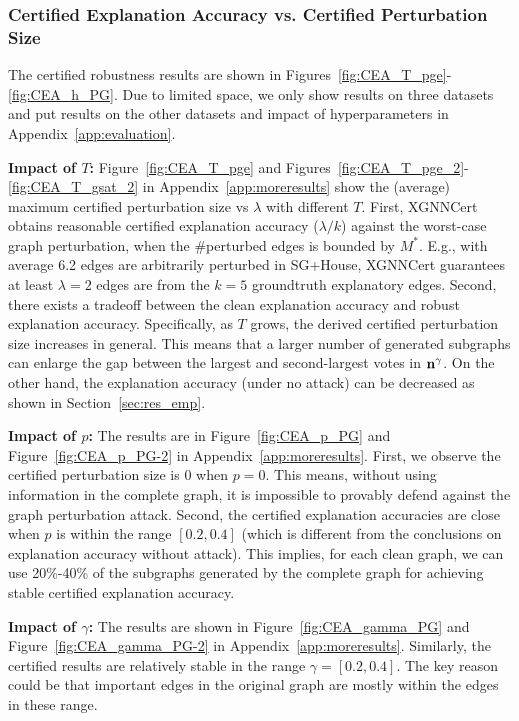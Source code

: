\subsubsection{Certified Explanation Accuracy vs. Certified Perturbation Size}
The certified robustness results are shown in Figures~\ref{fig:CEA_T_pge}-\ref{fig:CEA_h_PG}. Due to limited space, we only show results on three datasets and put results on the other datasets and impact of hyperparameters in Appendix~\ref{app:evaluation}. 

{\bf Impact of $T$:} 
Figure~\ref{fig:CEA_T_pge} and Figures~\ref{fig:CEA_T_pge_2}-\ref{fig:CEA_T_gsat_2} in Appendix~\ref{app:moreresults} show the (average) maximum certified perturbation size vs $\lambda$ with different $T$. 
First, XGNNCert obtains reasonable certified explanation accuracy ($\lambda / k$) against the worst-case graph perturbation, when the \#perturbed edges is bounded by ${M^*}$. 
E.g., with average 6.2 edges are arbitrarily perturbed in SG+House, XGNNCert guarantees at least $\lambda=2$ edges are from the $k=5$ groundtruth explanatory edges. 
Second, there exists a tradeoff between the clean explanation accuracy and robust explanation accuracy. Specifically, as $T$ grows, the derived 
 certified perturbation size increases in general. This means that a larger number of generated subgraphs can enlarge the gap between the largest and  second-largest votes in ${\bf n}^{\gamma}$. On the other hand, the explanation accuracy (under no attack) can be decreased as shown in Section~\ref{sec:res_emp}. 


{\bf Impact of $p$:} The results are in Figure~\ref{fig:CEA_p_PG} and Figure~\ref{fig:CEA_p_PG-2} in Appendix~\ref{app:moreresults}. First, we  observe the certified perturbation size is 0 when $p=0$. This means, without using information in the complete graph, it is impossible to provably defend against the graph perturbation attack.  Second, the certified explanation accuracies are close when $p$ is within the range $[0.2,0.4]$ (which is different from the conclusions on explanation accuracy without attack). This implies, for each clean graph, we can use 20\%-40\% of the subgraphs generated by the complete graph for achieving stable certified explanation accuracy.    

{\bf Impact of $\gamma$:} The results are shown in Figure~\ref{fig:CEA_gamma_PG} and Figure~\ref{fig:CEA_gamma_PG-2} in Appendix~\ref{app:moreresults}. 
Similarly, the certified results are relatively stable 
in the range $\gamma = [0.2, 0.4]$. The key reason could be that important edges in the original graph are mostly within the edges in these range. 

